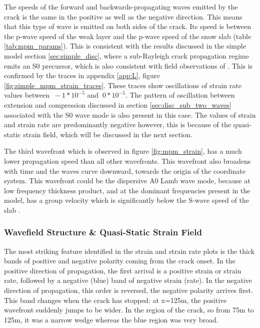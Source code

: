 The speeds of the forward and backwards-propagating waves emitted by the crack is the same in the positive as well as the negative direction. This means that this type of wave is emitted on both sides of the crack. Its speed is between the p-wave speed of the weak layer and the p-wave speed of the snow slab (table \ref{tab:mpm_params}). This is consistent with the results discussed in the simple model section \ref{sec:simple_disc}, where a sub-Rayleigh crack propagation regime emits an S0 precursor, which is also consistent with field observations of \cite{herwijnenSeismicSensorArray2011}. This is confirmed by the traces in appendix \ref{app:L}, figure \ref{fig:simple_mpm_strain_traces}. These traces show oscillations of strain rate values between $\ -1*10^{-5}$ and $\ 0*10^{-5}$. The pattern of oscillation between extension and compression discussed in section \ref{sec:disc_sub_two_waves} associated with the S0 wave mode is also present in this case. The values of strain and strain rate are predominantly negative however, this is because of the quasi-static strain field, which will be discussed in the next section. \par

The third wavefront which is observed in figure \ref{fig:mpm_strain}, has a much lower propagation speed than all other wavefronts. This wavefront also broadens with time and the waves curve downward, towards the origin of the coordinate system. This wavefront could be the dispersive A0 Lamb wave mode, because at low frequency thickness product, and at the dominant frequencies present in the model, has a group velocity which is significantly below the S-wave speed of the slab \parencite{roseWavesPlates2014}. \par

\subsubsection{Wavefield Structure \& Quasi-Static Strain Field }

The most striking feature identified in the strain and strain rate plots is the thick bands of positive and negative polarity coming from the crack onset. In the positive direction of propagation, the first arrival is a positive strain or strain rate, followed by a negative (blue) band of negative strain (rate). In the negative direction of propagation, this order is reversed, the negative polarity arrives first. This band changes when the crack has stopped: at x=125m, the positive wavefront suddenly jumps to be wider. In the region of the crack, so from 75m to 125m, it was a narrow wedge whereas the blue region was very broad. \par

